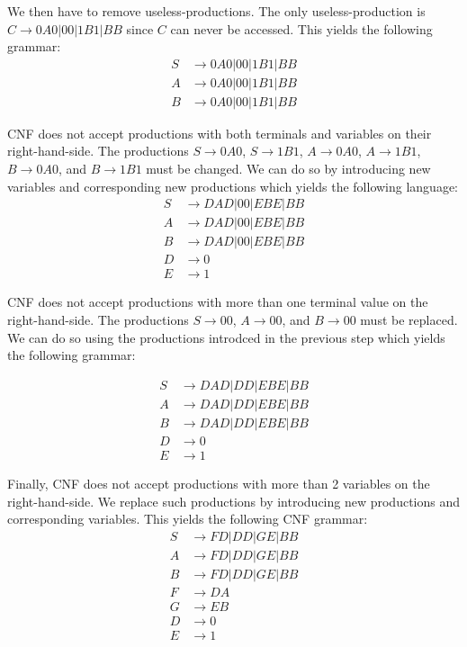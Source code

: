 \begin{enumerate}[label={(\alph*)}]
    \noindent We then have to remove useless-productions. The only useless-production is $C \rightarrow 0A0 | 00| 1B1 | BB$ since $C$ can never be accessed. This yields the following grammar:
    \begin{align*}
        S &\rightarrow 0A0 | 00| 1B1 | BB\\
        A &\rightarrow 0A0 | 00| 1B1 | BB\\
        B &\rightarrow 0A0 | 00| 1B1 | BB
    \end{align*}
    
    \noindent CNF does not accept productions with both terminals and variables on their right-hand-side. The productions $S \rightarrow 0A0$, $S \rightarrow 1B1$, $A \rightarrow 0A0$, $A \rightarrow 1B1$, $B \rightarrow 0A0$, and $B \rightarrow 1B1$ must be changed. We can do so by introducing new variables and corresponding new productions which yields the following language:
    \begin{align*}
        S &\rightarrow DAD | 00| EBE | BB\\
        A &\rightarrow DAD | 00| EBE | BB\\
        B &\rightarrow DAD | 00| EBE | BB\\
        D &\rightarrow 0\\
        E &\rightarrow 1
    \end{align*}
    
    \noindent CNF does not accept productions with more than one terminal value on the right-hand-side. The productions $S \rightarrow 00$, $A \rightarrow 00$, and $B \rightarrow 00$ must be replaced. We can do so using the productions introdced in the previous step which yields the following grammar:
    
    \begin{align*}
        S &\rightarrow DAD | DD| EBE | BB\\
        A &\rightarrow DAD | DD| EBE | BB\\
        B &\rightarrow DAD | DD| EBE | BB\\
        D &\rightarrow 0\\
        E &\rightarrow 1
    \end{align*}
    
    \noindent Finally, CNF does not accept productions with more than 2 variables on the right-hand-side. We replace such productions by introducing new productions and corresponding variables. This yields the following CNF grammar:
    \begin{align*}
        S &\rightarrow FD | DD| GE | BB\\
        A &\rightarrow FD | DD| GE | BB\\
        B &\rightarrow FD | DD| GE | BB\\
        F &\rightarrow DA\\
        G &\rightarrow EB\\
        D &\rightarrow 0\\
        E &\rightarrow 1
    \end{align*}
    
\end{enumerate}